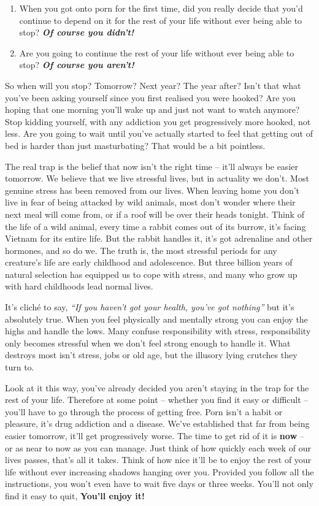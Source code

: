 \documentclass[
]{book}
\begin{document}
\begin{enumerate}
\def\labelenumi{\arabic{enumi}.}
\item
  When you got onto porn for the first time, did you really decide that you'd continue to depend on it for the rest of your life without ever being able to stop? \textbf{\emph{Of course you didn't!}}
\item
  Are you going to continue the rest of your life without ever being able to stop? \textbf{\emph{Of course you aren't!}}
\end{enumerate}

So when will you stop? Tomorrow? Next year? The year after? Isn't that what you've been asking yourself since you first realised you were hooked? Are you hoping that one morning you'll wake up and just not want to watch anymore? Stop kidding yourself, with any addiction you get progressively more hooked, not less. Are you going to wait until you've actually started to feel that getting out of bed is harder than just masturbating? That would be a bit pointless.

The real trap is the belief that now isn't the right time -- it'll always be easier tomorrow. We believe that we live stressful lives, but in actuality we don't. Most genuine stress has been removed from our lives. When leaving home you don't live in fear of being attacked by wild animals, most don't wonder where their next meal will come from, or if a roof will be over their heads tonight. Think of the life of a wild animal, every time a rabbit comes out of its burrow, it's facing Vietnam for its entire life. But the rabbit handles it, it's got adrenaline and other hormones, and so do we. The truth is, the most stressful periods for any creature's life are early childhood and adolescence. But three billion years of natural selection has equipped us to cope with stress, and many who grow up with hard childhoods lead normal lives.

It's cliché to say, \emph{``If you haven't got your health, you've got nothing''} but it's absolutely true. When you feel physically and mentally strong you can enjoy the highs and handle the lows. Many confuse responsibility with stress, responsibility only becomes stressful when we don't feel strong enough to handle it. What destroys most isn't stress, jobs or old age, but the illusory lying crutches they turn to.

Look at it this way, you've already decided you aren't staying in the trap for the rest of your life. Therefore at some point -- whether you find it easy or difficult -- you'll have to go through the process of getting free. Porn isn't a habit or pleasure, it's drug addiction and a disease. We've established that far from being easier tomorrow, it'll get progressively worse. The time to get rid of it is \textbf{now} -- or as near to now as you can manage. Just think of how quickly each week of our lives passes, that's all it takes. Think of how nice it'll be to enjoy the rest of your life without ever increasing shadows hanging over you. Provided you follow all the instructions, you won't even have to wait five days or three weeks. You'll not only find it easy to quit, \textbf{You'll enjoy it!}
\end{document}
